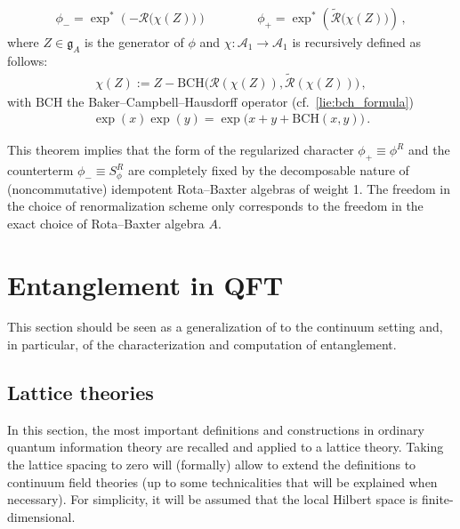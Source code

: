 \begin{theorem}
\begin{itemize}
            \begin{gather}
                \phi_- = \exp^*\left(-\mathcal{R}\bigl(\chi(Z)\bigr)\right) \qquad\qquad \phi_+ = \exp^*\left(\widetilde{\mathcal{R}}\bigl(\chi(Z)\bigr)\right)\,,
            \end{gather}
            where $Z\in\mathfrak{g}_A$ is the generator of $\phi$ and $\chi:\mathcal{A}_1\rightarrow\mathcal{A}_1$ is recursively defined as follows:
            \begin{gather}
                \chi(Z) := Z - \mathrm{BCH}\bigl(\mathcal{R}(\chi(Z)),\widetilde{\mathcal{R}}(\chi(Z))\bigr)\,,
            \end{gather}
            with $\mathrm{BCH}$ the Baker--Campbell--Hausdorff operator (cf.~\cref{lie:bch_formula})
            \begin{gather}
                \exp(x)\exp(y) = \exp\bigl(x+y+\mathrm{BCH}(x,y)\bigr)\,.
            \end{gather}
        \end{itemize}
    \end{theorem}

    This theorem implies that the form of the regularized character $\phi_+\equiv\phi^R$ and the counterterm $\phi_-\equiv S_\phi^R$ are completely fixed by the decomposable nature of (noncommutative) idempotent Rota--Baxter algebras of weight 1. The freedom in the choice of renormalization scheme only corresponds to the freedom in the exact choice of Rota--Baxter algebra $A$.

\section{Entanglement in QFT}

    This section should be seen as a generalization of  to the continuum setting and, in particular, of the characterization and computation of entanglement.

\subsection{Lattice theories}

    In this section, the most important definitions and constructions in ordinary quantum information theory are recalled and applied to a lattice theory. Taking the lattice spacing to zero will (formally) allow to extend the definitions to continuum field theories (up to some technicalities that will be explained when necessary). For simplicity, it will be assumed that the local Hilbert space is finite-dimensional.

